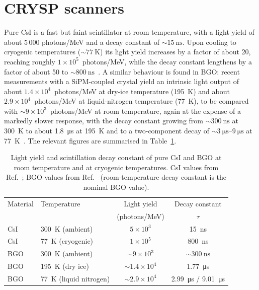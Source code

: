 \documentclass[11pt]{article}
\begin{document}
\section{CRYSP scanners}
\label{sec:crysp}
Pure CsI is a fast but faint scintillator at room temperature,
with a light yield of about $5\,000$ photons/MeV and a decay constant of
$\sim\!\SI{15}{\nano\second}$. Upon cooling to cryogenic temperatures ($\sim\!\SI{77}{\kelvin}$) its light
yield increases by a factor of about 20, reaching roughly
$1\times10^{5}$~photons/MeV, while the decay constant lengthens by a factor of
about 50 to $\sim\!\SI{800}{\nano\second}$~\cite{soleti_crysp}. A similar behaviour is found
in BGO: recent measurements with a SiPM-coupled crystal yield an intrinsic
light output of about $1.4\times10^{4}$~photons/MeV at dry-ice temperature
(\SI{195}{\kelvin}) and about $2.9\times10^{4}$~photons/MeV at liquid-nitrogen
temperature (\SI{77}{\kelvin}), to be compared with $\sim\!9\times10^{3}$~photons/MeV at
room temperature, again at the expense of a markedly slower response, with the
decay constant growing from $\sim\!\SI{300}{\nano\second}$ at \SI{300}{\kelvin} to about \SI{1.8}{\micro\second} at
\SI{195}{\kelvin} and to a two-component decay of $\sim\!\SIrange{3}{9}{\micro\second}$ at
\SI{77}{\kelvin}~\cite{ding_bgo}. The relevant figures are summarised in
Table~\ref{tab:cryo_scint}.

\begin{table}[ht]
  \centering
  \begin{tabular}{llcc}
    \hline
    Material & Temperature & Light yield & Decay constant \\
             &             & (photons/MeV) & $\tau$ \\
    \hline
    CsI & \SI{300}{\kelvin} (ambient)          & $5\times10^{3}$   & \SI{15}{\nano\second} \\
    CsI & \SI{77}{\kelvin} (cryogenic)        & $1\times10^{5}$   & \SI{800}{\nano\second} \\
    \hline
    BGO & \SI{300}{\kelvin} (ambient)          & $\sim\!9\times10^{3}$ & $\sim\!\SI{300}{\nano\second}$ \\
    BGO & \SI{195}{\kelvin} (dry ice)          & $\sim\!1.4\times10^{4}$ & \SI{1.77}{\micro\second} \\
    BGO & \SI{77}{\kelvin} (liquid nitrogen)   & $\sim\!2.9\times10^{4}$ & \SI{2.99}{\micro\second} / \SI{9.01}{\micro\second} \\
    \hline
  \end{tabular}
  \caption{Light yield and scintillation decay constant of pure CsI and BGO at
  room temperature and at cryogenic temperatures. CsI values from
  Ref.~\cite{soleti_crysp}; BGO values from Ref.~\cite{ding_bgo}
  (room-temperature decay constant is the nominal BGO value).}
  \label{tab:cryo_scint}
\end{table}
\end{document}
